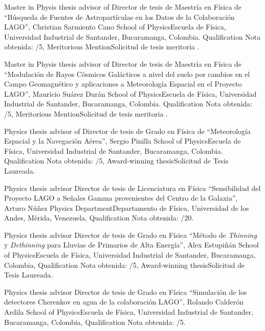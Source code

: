\ifeng
Master in Physis thesis advisor of
 \else
Director de tesis de Maestría en Física de
 \fi
``Búsqueda de Fuentes de Astropartículas en los Datos de la Colaboración LAGO'', Christian Sarmiento Cano \at \ifeng School of Physics\else Escuela de Física\fi, Universidad Industrial de Santander, Bucaramanga, Colombia. \ifeng Qualification \else Nota obtenida: /5, \ifeng Meritorious Mention\else Solicitud de tesis meritoria \fi.

\ifeng
Master in Physis thesis advisor of
 \else
Director de tesis de Maestría en Física de
 \fi
``Modulación de Rayos Cósmicos Galácticos a nivel del suelo por cambios en el Campo Geomagnético y aplicaciones a Meteorología Espacial en el Proyecto LAGO'', Mauricio Suárez Durán \at \ifeng School of Physics\else Escuela de Física\fi, Universidad Industrial de Santander, Bucaramanga, Colombia. \ifeng Qualification \else Nota obtenida: /5, \ifeng Meritorious Mention\else Solicitud de tesis meritoria \fi.

\ifeng
Physics thesis advisor of
 \else
Director de tesis de Grado en Física de
 \fi
``Meteorología Espacial y la Navegación Aérea'', Sergio Pinilla \at \ifeng School of Physics\else Escuela de Física\fi, Universidad Industrial de Santander, Bucaramanga, Colombia.  \ifeng Qualification \else Nota obtenida: /5, \ifeng Award-winning thesis\else Solicitud de Tesis Laureada\fi.

\ifeng
Physics thesis advisor
 \else
Director de tesis de Licenciatura en Física
 \fi
``Sensibilidad del Proyecto LAGO a Señales Gamma provenientes del Centro de la Galaxia'', Arturo Núñez \at \ifeng Physics Department\else Departamento de Física\fi, Universidad de los Andes, Mérida, Venezuela, \ifeng Qualification \else Nota obtenida: /20.

\ifeng
Physics thesis advisor
 \else
Director de tesis de Grado en Física
 \fi
``Método de {\textit{Thinning}} y {\textit{Dethinning}} para Lluvias de Primarios de Alta Energía'', Alex Estupiñán \at \ifeng School of Physics\else Escuela de Física\fi, Universidad Industrial de Santander, Bucaramanga, Colombia, \ifeng Qualification \else Nota obtenida: /5, \ifeng Award-winning thesis\else Solicitud de Tesis Laureada\fi.

\ifeng
Physics thesis advisor
 \else
Director de tesis de Grado en Física
 \fi
``Simulación de los detectores Cherenkov en agua de la colaboración LAGO'', Rolando Calderón Ardila \at \ifeng School of Physics\else Escuela de Física\fi, Universidad Industrial de Santander, Bucaramanga, Colombia, \ifeng Qualification \else Nota obtenida: /5. 

